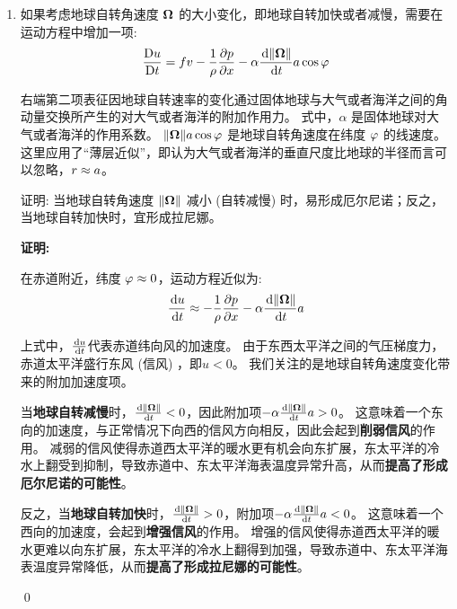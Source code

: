 \begin{enumerate}
    \qed

    \item 如果考虑地球自转角速度 $\bm{\Omega}$ 的大小变化，即地球自转加快或者减慢，需要在运动方程中增加一项:
    \begin{equation*}
        \matderiv{u} = \coriolis v -\frac{1}{\density} \pde{\pressure}{x} - \alpha \ode{\norm{\rotationvec}}{\timevar} \earthradius \cos\latitude
    \end{equation*}

    右端第二项表征因地球自转速率的变化通过固体地球与大气或者海洋之间的角动量交换所产生的对大气或者海洋的附加作用力。
    式中，$\alpha$ 是固体地球对大气或者海洋的作用系数。
    $\lVert \bm{\Omega} \rVert a \cos\varphi$ 是地球自转角速度在纬度 $\varphi$ 的线速度。
    这里应用了“薄层近似”，即认为大气或者海洋的垂直尺度比地球的半径而言可以忽略，$r \approx a$。

    证明: 当地球自转角速度 $\lVert \bm{\Omega} \rVert$ 减小 (自转减慢) 时，易形成厄尔尼诺；反之，当地球自转加快时，宜形成拉尼娜。

    \vspace{1em}
    \textbf{证明:}

    在赤道附近，纬度 $\varphi \approx 0$，运动方程近似为:
    \begin{equation*}
        \ode{u}{\timevar} \approx -\frac{1}{\density} \pde{\pressure}{x} - \alpha \ode{\norm{\rotationvec}}{\timevar} \earthradius
    \end{equation*}

    上式中，$\ode{u}{\timevar}$代表赤道纬向风的加速度。
    由于东西太平洋之间的气压梯度力，赤道太平洋盛行东风 (信风) ，即$u < 0$。
    我们关注的是地球自转角速度变化带来的附加加速度项。

    当\textbf{地球自转减慢}时，$\ode{\norm{\rotationvec}}{\timevar} < 0$，因此附加项$-\alpha \ode{\norm{\rotationvec}}{\timevar} \earthradius > 0$。
    这意味着一个东向的加速度，与正常情况下向西的信风方向相反，因此会起到\textbf{削弱信风}的作用。
    减弱的信风使得赤道西太平洋的暖水更有机会向东扩展，东太平洋的冷水上翻受到抑制，导致赤道中、东太平洋海表温度异常升高，从而\textbf{提高了形成厄尔尼诺的可能性}。

    反之，当\textbf{地球自转加快}时，$\ode{\norm{\rotationvec}}{\timevar} > 0$，附加项$-\alpha \ode{\norm{\rotationvec}}{\timevar} \earthradius < 0$。
    这意味着一个西向的加速度，会起到\textbf{增强信风}的作用。
    增强的信风使得赤道西太平洋的暖水更难以向东扩展，东太平洋的冷水上翻得到加强，导致赤道中、东太平洋海表温度异常降低，从而\textbf{提高了形成拉尼娜的可能性}。

    \qed

\end{enumerate}

